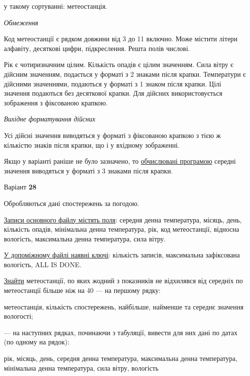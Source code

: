 \documentclass[11pt, ukrainian]{article}
\begin{document}
{\noindent}у такому сортуванні: метеостанція.


\bigskip\textit{Обмеження}

Код метеостанції є рядком довжини від 3 до 11 включно.
Може містити літери алфавіту, десяткові цифри, підкреслення. Решта полів числові.

Рік є чотиризначним цілим.
Кількість опадів є цілим значенням.
Сила вітру є дійсним значенням, подається у форматі з 2 знаками після крапки.
Температури є дійсними значеннями, подаються у форматі з 1 знаком після крапки.
Цілі значення подаються без десяткової крапки.
Для дійсних використовується зображення з фіксованою крапкою.

\textit{Вихідне форматування дійсних}

Усі дійсні значення виводяться у форматі з фіксованою крапкою з тією ж кількістю знаків після крапки, що і у вхідному зображенні.

Якщо у варіанті раніше не було зазначено, то \underline{обчислювані програмою} середні значення виводяться у форматі з 3 знаками після крапки.


\par
\newpage
{\center Варіант  \No \textbf { 28 }\par}
\bigskip
Обробляються дані спостережень за погодою. 

\underline{Записи основного файлу містять поля}: середня денна температура, місяць, день, кількість опадів, мінімальна денна температура, рік, код метеостанції, відносна вологість, максимальна денна температура, сила вітру.

\underline{У допоміжному файлі наявні ключі}: кількість записів, максимальна зафіксована вологість, ALL IS DONE.

\underline{Знайти} метеостанції, по яких жодний з показників не відхилявся від середніх по метеостанції більше ніж на 40%
{\noindent}--- на першому рядку:\par
метеостанція, кількість спостережень, найбільше, найменше та середнє значення вологості;

{\noindent}--- на наступних рядках, починаючи з табуляції, вивести для них дані по датах (по одному на рядок):\par
рік, місяць, день, середня денна температура, максимальна денна температура, мінімальна денна температура, сила вітру, вологість
\end{document}
